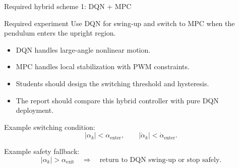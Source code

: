 \documentclass[aspectratio=169]{beamer}
\begin{document}
\begin{frame}{Required hybrid scheme 1: DQN + MPC}

\begin{block}{Required experiment}
\small
Use DQN for swing-up and switch to MPC when the pendulum enters the upright region.
\end{block}

\vspace{0.2cm}

\begin{itemize}
    \item DQN handles large-angle nonlinear motion.
    \vspace{0.18cm}
    \item MPC handles local stabilization with PWM constraints.
    \vspace{0.18cm}
    \item Students should design the switching threshold and hysteresis.
    \vspace{0.18cm}
    \item The report should compare this hybrid controller with pure DQN deployment.
\end{itemize}

\vspace{0.2cm}

Example switching condition:
\[
|\alpha_k|<\alpha_{\mathrm{enter}},
\qquad
|\dot{\alpha}_k|<\dot{\alpha}_{\mathrm{enter}}.
\]

\vspace{0.05cm}

Example safety fallback:
\[
|\alpha_k|>\alpha_{\mathrm{exit}}
\quad \Rightarrow \quad
\text{return to DQN swing-up or stop safely}.
\]

\end{frame}
\end{document}
